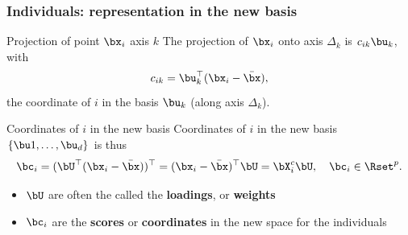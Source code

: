 \documentclass{beamer}\usepackage[]{graphicx}\usepackage[]{color}
\makeatletter
\newcommand{\hlopt}[1]{\textcolor[rgb]{0,0,0}{#1}}%
\newcommand{\hlstd}[1]{\textcolor[rgb]{0.345,0.345,0.345}{#1}}%
\newcommand{\hlkwc}[1]{\textcolor[rgb]{0.333,0.667,0.333}{#1}}%
\newcommand{\hlkwd}[1]{\textcolor[rgb]{0.737,0.353,0.396}{\textbf{#1}}}%
\newenvironment{kframe}{%
 \def\at@end@of@kframe{}%
 \ifinner\ifhmode%
  \def\at@end@of@kframe{\end{minipage}}%
  \begin{minipage}{\columnwidth}%
 \fi\fi%
 \def\FrameCommand##1{\hskip\@totalleftmargin \hskip-\fboxsep
 \colorbox{shadecolor}{##1}\hskip-\fboxsep
     \hskip-\linewidth \hskip-\@totalleftmargin \hskip\columnwidth}%
 \MakeFramed {\advance\hsize-\width
   \@totalleftmargin\z@ \linewidth\hsize
   \@setminipage}}%
 {\par\unskip\endMakeFramed%
 \at@end@of@kframe}
\newenvironment{knitrout}{}{} %
\makeatother
\begin{document}
\begin{frame}
  \frametitle{Individuals: representation in the new basis}

  \begin{block}{Projection of point $\bx_i$ axis $k$}
    The projection of $\bx_i$ onto axis $\Delta_k$ is $c_{ik} \bu_k$, with 
    \begin{equation*}
      c_{ik} = \bu_k^\top (\bx_i - \bar{\bx}),
    \end{equation*}
     the coordinate of $i$ in the basis $\bu_k$ (along axis $\Delta_k$).
  \end{block}

  \begin{block}{Coordinates of $i$ in the new basis}
    Coordinates of $i$ in the new basis $\{\bu1, \dots, \bu_d\}$ is thus 
    \begin{equation*}
      \bc_i  = (\bU^\top (\bx_i - \bar{\bx}))^\top = (\bx_i - \bar{\bx})^\top \bU = \bX^c_i \bU, \quad \bc_i \in \Rset^p.
    \end{equation*}

    \begin{itemize}
      \item \alert{$\bU$ are often the called the \textbf{loadings}, or \textbf{weights}}
      \item \alert{$ \bc_i$ are the \textbf{scores} or \textbf{coordinates} in the new space for the individuals}
    \end{itemize}
  \end{block}
\end{frame}


\end{document}
